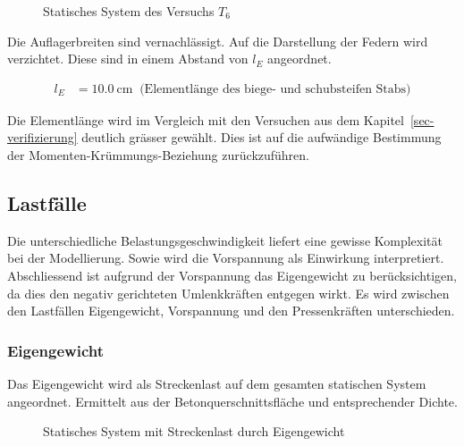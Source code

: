 \documentclass[
  11pt,
  letterpaper,
]{scrreprt}
\begin{document}
\begin{figure}[H]


\caption{\label{fig-system_t6}Statisches System des Versuchs \(T_6\)}

\end{figure}%

Die Auflagerbreiten sind vernachlässigt. Auf die Darstellung der Federn
wird verzichtet. Diese sind in einem Abstand von \(l_E\) angeordnet.

$$
\begin{aligned}
l_{E} &= 10.0\ \mathrm{cm} \; \;\textrm{(Elementlänge des biege- und schubsteifen Stabs)}
\end{aligned}
$$

Die Elementlänge wird im Vergleich mit den Versuchen aus dem
Kapitel~\ref{sec-verifizierung} deutlich grässer gewählt. Dies ist auf
die aufwändige Bestimmung der Momenten-Krümmungs-Beziehung
zurückzuführen.

\subsection{Lastfälle}\label{lastfuxe4lle}

Die unterschiedliche Belastungsgeschwindigkeit liefert eine gewisse
Komplexität bei der Modellierung. Sowie wird die Vorspannung als
Einwirkung interpretiert. Abschliessend ist aufgrund der Vorspannung das
Eigengewicht zu berücksichtigen, da dies den negativ gerichteten
Umlenkkräften entgegen wirkt. Es wird zwischen den Lastfällen
Eigengewicht, Vorspannung und den Pressenkräften unterschieden.

\subsubsection{Eigengewicht}\label{eigengewicht}

Das Eigengewicht wird als Streckenlast auf dem gesamten statischen
System angeordnet. Ermittelt aus der Betonquerschnittsfläche und
entsprechender Dichte.

\begin{figure}[H]


\caption{\label{fig-t6_lastfall_eg}Statisches System mit Streckenlast
durch Eigengewicht}

\end{figure}%
\end{document}
